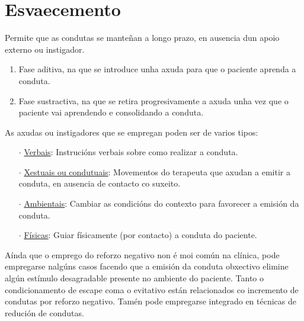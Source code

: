 \documentclass[a4paper,11pt]{article}
\begin{document}
\section{Esvaecemento}
Permite que as condutas se manteñan a longo prazo, en ausencia dun apoio externo ou instigador. 
\begin{enumerate}
	\item Fase aditiva, na que se introduce unha axuda para que o paciente aprenda a conduta.
	\item Fase sustractiva, na que se retira progresivamente a axuda unha vez que o paciente vai 
	aprendendo e consolidando a conduta. 
\end{enumerate}

As axudas ou instigadores que se empregan poden ser de varios tipos:
\begin{itemize}
	\item[$\cdot$] \underline{Verbais}: Instrucións verbais sobre como realizar a conduta.
	\item[$\cdot$] \underline{Xestuais ou condutuais}: Movementos do terapeuta que axudan a emitir a 
	conduta, en ausencia de contacto co suxeito.
	\item[$\cdot$] \underline{Ambientais}: Cambiar as condicións do contexto para favorecer a emisión 
	da conduta.
	\item[$\cdot$] \underline{Físicas}: Guiar físicamente (por contacto) a conduta do paciente. 
\end{itemize}

Aínda que o emprego do reforzo negativo non é moi común na clínica, pode empregarse nalgúns casos facendo que a emisión da conduta obxectivo elimine algún estímulo desagradable presente no ambiente do paciente. Tanto o condicionamento de escape coma o evitativo están relacionados co incremento de condutas por reforzo negativo. Tamén pode empregarse integrado en técnicas de redución de condutas. 
\end{document}
